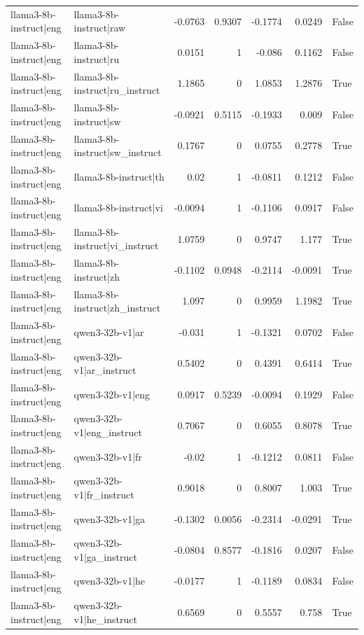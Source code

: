 \begin{table}
\begin{tabular}{l l r r r r l}
llama3-8b-instruct|eng & llama3-8b-instruct|raw & -0.0763 & 0.9307 & -0.1774 & 0.0249 & False \\
llama3-8b-instruct|eng & llama3-8b-instruct|ru & 0.0151 & 1 & -0.086 & 0.1162 & False \\
llama3-8b-instruct|eng & llama3-8b-instruct|ru_instruct & 1.1865 & 0 & 1.0853 & 1.2876 & True \\
llama3-8b-instruct|eng & llama3-8b-instruct|sw & -0.0921 & 0.5115 & -0.1933 & 0.009 & False \\
llama3-8b-instruct|eng & llama3-8b-instruct|sw_instruct & 0.1767 & 0 & 0.0755 & 0.2778 & True \\
llama3-8b-instruct|eng & llama3-8b-instruct|th & 0.02 & 1 & -0.0811 & 0.1212 & False \\
llama3-8b-instruct|eng & llama3-8b-instruct|vi & -0.0094 & 1 & -0.1106 & 0.0917 & False \\
llama3-8b-instruct|eng & llama3-8b-instruct|vi_instruct & 1.0759 & 0 & 0.9747 & 1.177 & True \\
llama3-8b-instruct|eng & llama3-8b-instruct|zh & -0.1102 & 0.0948 & -0.2114 & -0.0091 & True \\
llama3-8b-instruct|eng & llama3-8b-instruct|zh_instruct & 1.097 & 0 & 0.9959 & 1.1982 & True \\
llama3-8b-instruct|eng & qwen3-32b-v1|ar & -0.031 & 1 & -0.1321 & 0.0702 & False \\
llama3-8b-instruct|eng & qwen3-32b-v1|ar_instruct & 0.5402 & 0 & 0.4391 & 0.6414 & True \\
llama3-8b-instruct|eng & qwen3-32b-v1|eng & 0.0917 & 0.5239 & -0.0094 & 0.1929 & False \\
llama3-8b-instruct|eng & qwen3-32b-v1|eng_instruct & 0.7067 & 0 & 0.6055 & 0.8078 & True \\
llama3-8b-instruct|eng & qwen3-32b-v1|fr & -0.02 & 1 & -0.1212 & 0.0811 & False \\
llama3-8b-instruct|eng & qwen3-32b-v1|fr_instruct & 0.9018 & 0 & 0.8007 & 1.003 & True \\
llama3-8b-instruct|eng & qwen3-32b-v1|ga & -0.1302 & 0.0056 & -0.2314 & -0.0291 & True \\
llama3-8b-instruct|eng & qwen3-32b-v1|ga_instruct & -0.0804 & 0.8577 & -0.1816 & 0.0207 & False \\
llama3-8b-instruct|eng & qwen3-32b-v1|he & -0.0177 & 1 & -0.1189 & 0.0834 & False \\
llama3-8b-instruct|eng & qwen3-32b-v1|he_instruct & 0.6569 & 0 & 0.5557 & 0.758 & True \\

\end{tabular}
\end{table}
